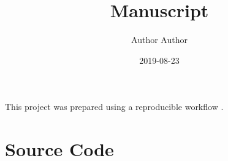 \documentclass[letterpaper]{quantumarticle}
\newcommand{\sourcefolder}{../src}
\begin{document}
\title{Manuscript}
\date{2019-08-23}

\author{Author Author}
    \affilTODO

\begin{abstract}
    \TODO
\end{abstract}

\maketitle

\begin{acknowledgments}
    This project was prepared using a reproducible workflow \cite{granade_reproducible_2017}.
\end{acknowledgments}

\nocite{apsrev41Control}



\appendix
\onecolumngrid

\section{Source Code}


\end{document}
